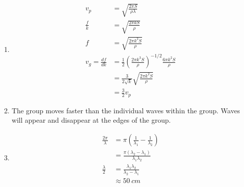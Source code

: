 \documentclass{article}
\begin{document}
\begin{enumerate}
  \item

        \begin{align*}
          v_p                   & = \sqrt{\frac{2 \pi S}{\rho \lambda}}                                                   \\
          \frac{f}{k}           & = \sqrt{\frac{2 \pi k S}{\rho}}                                                         \\
          f                     & = \sqrt{\frac{2 \pi k^3 S}{\rho}}                                                       \\
          v_g = \frac{d f}{d k} & = \frac{1}{2} \left( \frac{2 \pi k^3 S}{\rho} \right)^{-1 / 2} \frac{6 \pi k^2 S}{\rho} \\
                                & = \frac{3}{2 \sqrt{k}} \sqrt{\frac{2 \pi k^2 S}{\rho}}                                  \\
                                & = \frac{3}{2} v_p
        \end{align*}

  \item The group moves faster than the individual waves within the group. Waves will appear and disappear at the edges of the group.

  \item

        \begin{align*}
          \frac{2 \pi}{\lambda} & = \pi \left( \frac{1}{\lambda_1} - \frac{1}{\lambda_2} \right) \\
                                & = \frac{\pi (\lambda_2 - \lambda_1)}{\lambda_1 \lambda_2}      \\
          \frac{\lambda}{2}     & = \frac{\lambda_1 \lambda_2}{\lambda_2 - \lambda_1}            \\
                                & \approx \qty{50}{cm}
        \end{align*}
\end{enumerate}

\setcounter{subsection}{19}
\subsection{}
\end{document}

